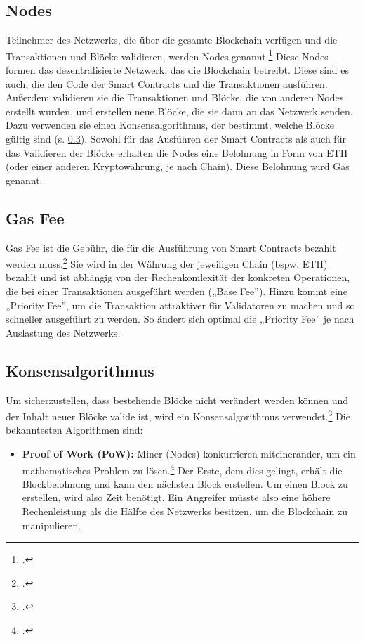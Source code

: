 \documentclass[12pt, a4paper]{article}
\begin{document}
{\subsection{Nodes}
\label{sec:definition-nodes}
Teilnehmer des Netzwerks, die über die gesamte Blockchain verfügen und die Transaktionen und Blöcke validieren, werden Nodes genannt.\footcites[Vgl. hierzu und zum Folgenden][]{w12}[]{w13} 
Diese Nodes formen das dezentralisierte Netzwerk, das die Blockchain betreibt.
Diese sind es auch, die den Code der Smart Contracts und die Transaktionen ausführen.
Außerdem validieren sie die Transaktionen und Blöcke, die von anderen Nodes erstellt wurden, und erstellen neue Blöcke, die sie dann an das Netzwerk senden.
Dazu verwenden sie einen Konsensalgorithmus, der bestimmt, welche Blöcke gültig sind (s. \ref{sec:definition-konsensalgorithmus}). 
Sowohl für das Ausführen der Smart Contracts als auch für das Validieren der Blöcke erhalten die Nodes eine Belohnung in Form von ETH (oder einer anderen Kryptowährung, je nach Chain). 
Diese Belohnung wird Gas genannt.
\subsection{Gas Fee}
\label{sec:definition-gas-fee}
Gas Fee ist die Gebühr, die für die Ausführung von Smart Contracts bezahlt werden muss.\footcite[Vgl. hierzu und zum Folgenden][]{w31} 
Sie wird in der Währung der jeweiligen Chain (bspw. ETH) bezahlt und ist abhängig von der Rechenkomlexität der konkreten Operationen, die bei einer Transaktionen ausgeführt werden („Base Fee”).
Hinzu kommt eine „Priority Fee”, um die Transaktion attraktiver für Validatoren zu machen und so schneller ausgeführt zu werden.
So ändert sich optimal die „Priority Fee” je nach Auslastung des Netzwerks. 
\subsection{Konsensalgorithmus}
\label{sec:definition-konsensalgorithmus}
Um sicherzustellen, dass bestehende Blöcke nicht verändert werden können und der Inhalt neuer Blöcke valide ist, wird ein Konsensalgorithmus verwendet.\footcite[Vgl.][S. 2 f\adddot]{q4}
Die bekanntesten Algorithmen sind:
\begin{itemize}
    \item \textbf{Proof of Work (PoW):}
    Miner (Nodes) konkurrieren miteinerander, um ein mathematisches Problem zu lösen.\footcite[Vgl. hierzu und zum Folgenden][3]{q4}
    Der Erste, dem dies gelingt, erhält die Blockbelohnung und kann den nächsten Block erstellen.
    Um einen Block zu erstellen, wird also Zeit benötigt. 
    Ein Angreifer müsste also eine höhere Rechenleistung als die Hälfte des Netzwerks besitzen, um die Blockchain zu manipulieren.


\end{itemize}}
\end{document}
